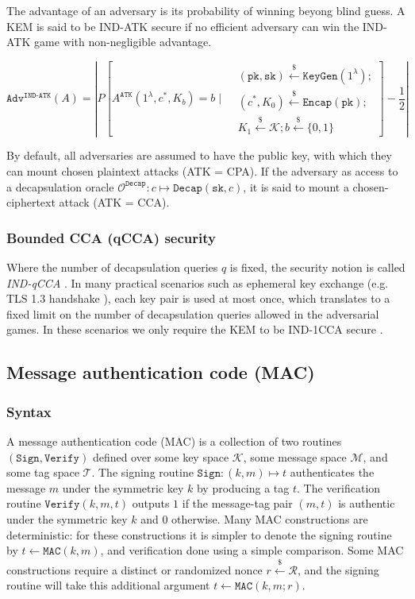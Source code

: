 \documentclass[runningheads]{llncs}
\newcommand{\keygen}{\texttt{KeyGen}}
\newcommand{\encap}{\texttt{Encap}}
\newcommand{\decap}{\texttt{Decap}}
\newcommand{\mac}{\texttt{MAC}}
\newcommand{\sign}{\texttt{Sign}}
\newcommand{\verify}{\texttt{Verify}}
\newcommand{\pk}{\texttt{pk}}
\newcommand{\sk}{\texttt{sk}}
\newcommand{\leftsample}{\stackrel{\$}{\leftarrow}}
\begin{document}
The advantage of an adversary is its probability of winning beyong blind guess. A KEM is said to be IND-ATK secure if no efficient adversary can win the IND-ATK game with non-negligible advantage.

$$
\texttt{Adv}^\texttt{IND-ATK}(A) = \left\vert P\left[
    A^\texttt{ATK}(1^\lambda, c^\ast, K_b) = b
    \mid \begin{aligned}
    &(\pk, \sk) \leftsample \keygen(1^\lambda); \\
    &(c^\ast, K_0) \leftsample \encap(\pk); \\
    &K_1 \leftsample \mathcal{K}; b \leftsample \{0,1\}
    \end{aligned}
\right] - \frac{1}{2}
\right\vert
$$

By default, all adversaries are assumed to have the public key, with which they can mount chosen plaintext attacks (ATK = CPA). If the adversary as access to a decapsulation oracle $\mathcal{O}^\decap: c \mapsto \decap(\sk, c)$, it is said to mount a chosen-ciphertext attack (ATK = CCA).

\subsubsection{Bounded CCA (qCCA) security} Where the number of decapsulation queries $q$ is fixed, the security notion is called \textit{IND-qCCA} \cite{DBLP:conf/asiacrypt/CramerHHIKPSV07,DBLP:conf/eurocrypt/Huguenin-Dumittan22}. In many practical scenarios such as ephemeral key exchange (e.g. TLS 1.3 handshake \cite{RFC8446}), each key pair is used at most once, which translates to a fixed limit on the number of decapsulation queries allowed in the adversarial games. In these scenarios we only require the KEM to be IND-1CCA secure \cite{DBLP:conf/ccs/SchwabeSW20,DBLP:conf/ccs/DowlingFGS15}.

\subsection{Message authentication code (MAC)}\label{sec:message-authentication-code}
\subsubsection{Syntax} A message authentication code (MAC) is a collection of two routines $(\sign, \verify)$ defined over some key space $\mathcal{K}$, some message space $\mathcal{M}$, and some tag space $\mathcal{T}$. The signing routine $\sign: (k, m) \mapsto t$ authenticates the message $m$ under the symmetric key $k$ by producing a tag $t$. The verification routine $\verify(k,m,t)$ outputs $1$ if the message-tag pair $(m, t)$ is authentic under the symmetric key $k$ and $0$ otherwise. Many MAC constructions are deterministic: for these constructions it is simpler to denote the signing routine by $t \leftarrow \mac(k, m)$, and verification done using a simple comparison. Some MAC constructions require a distinct or randomized nonce $r \leftsample \mathcal{R}$, and the signing routine will take this additional argument $t \leftarrow \mac(k, m; r)$.
\end{document}
